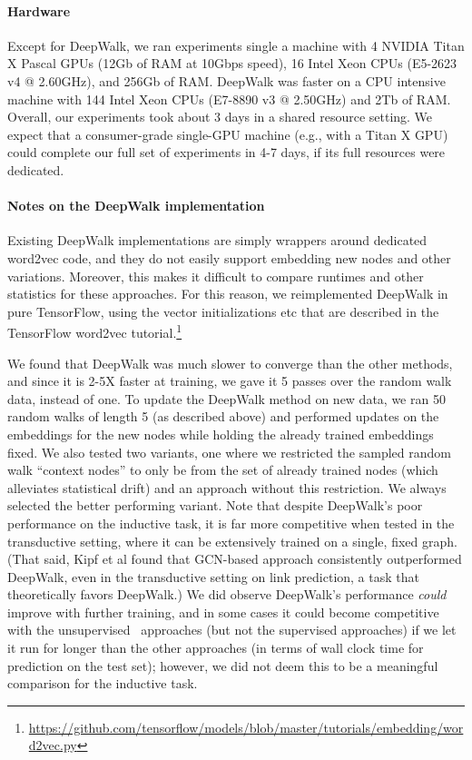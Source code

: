 \paragraph{Hardware}
Except for DeepWalk, we ran experiments single a machine with 4 NVIDIA Titan X Pascal GPUs (12Gb of RAM at 10Gbps speed), 16 Intel Xeon CPUs (E5-2623 v4 @ 2.60GHz), and 256Gb of RAM.  
DeepWalk was faster on a CPU intensive machine with 144 Intel Xeon CPUs (E7-8890 v3 @ 2.50GHz) and 2Tb of RAM. 
Overall, our experiments took about 3 days in a shared resource setting. 
We expect that a consumer-grade single-GPU machine (e.g., with a Titan X GPU) could complete our full set of experiments in 4-7 days, if its full resources were dedicated. 

\paragraph{Notes on the DeepWalk implementation}
Existing DeepWalk implementations \cite{perozzi2014deepwalk,grover2016node2vec} are simply wrappers around dedicated word2vec code, and they do not easily support embedding new nodes and other variations. 
Moreover, this makes it difficult to compare runtimes and other statistics for these approaches.
For this reason, we reimplemented DeepWalk in pure TensorFlow, using the vector initializations etc that are described in the TensorFlow word2vec tutorial.\footnote{\url{https://github.com/tensorflow/models/blob/master/tutorials/embedding/word2vec.py}}

We found that DeepWalk was much slower to converge than the other methods, and since it is 2-5X faster at training, we gave it 5 passes over the random walk data, instead of one.
To update the DeepWalk method on new data, we ran 50 random walks of length 5 (as described above) and performed updates on the embeddings for the new nodes while holding the already trained embeddings fixed. 
We also tested two variants, one where we restricted the sampled random walk ``context nodes'' to only be from the set of already trained nodes (which alleviates statistical drift) and an approach without this restriction. 
We always selected the better performing variant. 
Note that despite DeepWalk's poor performance on the inductive task, it is far more competitive when tested in the transductive setting, where it can be extensively trained on a single, fixed graph. 
(That said, Kipf et al \cite{kipf2016semi}\cite{kipf2016variational} found that GCN-based approach consistently outperformed DeepWalk, even in the transductive setting on link prediction, a task that theoretically favors DeepWalk.)
We did observe DeepWalk's performance {\em could} improve with further training, and in some cases it could become competitive with the unsupervised \name\ approaches (but not the supervised approaches) if we let it run for  longer than the other approaches (in terms of wall clock time for prediction on the test set); however, we did not deem this to be a meaningful comparison for the inductive task. 

